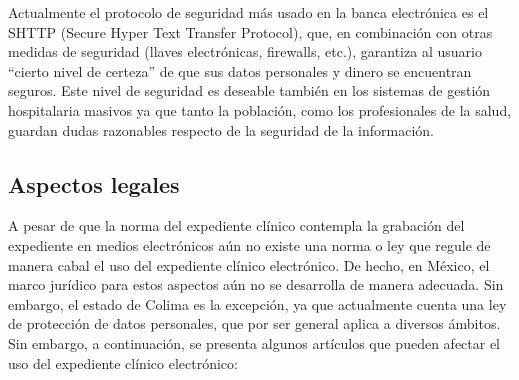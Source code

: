 Actualmente el protocolo de seguridad más usado en la banca electrónica es el SHTTP (Secure Hyper Text Transfer Protocol), que, en combinación con otras medidas de seguridad (llaves electrónicas, firewalls, etc.), garantiza al usuario “cierto nivel de certeza” de que sus datos personales y dinero se encuentran seguros. Este nivel de seguridad es deseable también en los sistemas de gestión hospitalaria masivos ya que tanto la población, como los profesionales de la salud, guardan dudas razonables respecto de la seguridad de la información. \cite{marco2}
\subsection{Aspectos legales}
A pesar de que la norma del expediente clínico contempla la grabación del expediente en medios electrónicos aún no existe una norma o ley que regule de manera cabal el uso del expediente clínico electrónico. De hecho, en México, el marco jurídico para estos aspectos aún no se desarrolla de manera adecuada. Sin embargo, el estado de Colima es la excepción, ya que actualmente cuenta una ley de protección de datos personales, que por ser general aplica a diversos ámbitos. Sin embargo, a continuación, se presenta algunos artículos que pueden afectar el uso del expediente clínico electrónico:
